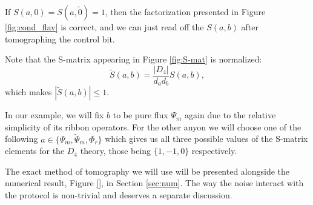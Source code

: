 \documentclass[two column]{article}
\begin{document}
If $S(a, 0) = S(a, \tilde{0}) = 1$, then the factorization presented in Figure \ref{fig:cond_flav} is correct, and we can just read off the $S(a,b)$ after tomographing the control bit.

Note that the S-matrix appearing in Figure \ref{fig:S-mat} is normalized:
\begin{equation}
    \tilde{S}(a,b) = \frac{|D_4|}{d_a d_b}S(a,b),
\end{equation}
which makes $|\tilde{S}(a,b)| \leq 1$.

In our example, we will fix $b$ to be pure flux $\Psi_m$ again due to the relative simplicity of its ribbon operators. For the other anyon we will choose one of the following $a\in\{\Psi_m,\tilde{\Psi}_m, \Phi_r \}$ which gives us all three possible values of the S-matrix elements for the $D_4$ theory, those being $\{1, -1, 0\}$ respectively.

The exact method of tomography we will use will be presented alongside the numerical result, Figure \ref{}, in Section \ref{sec:num}. The way the noise interact with the protocol is non-trivial and deserves a separate discussion.
\end{document}

